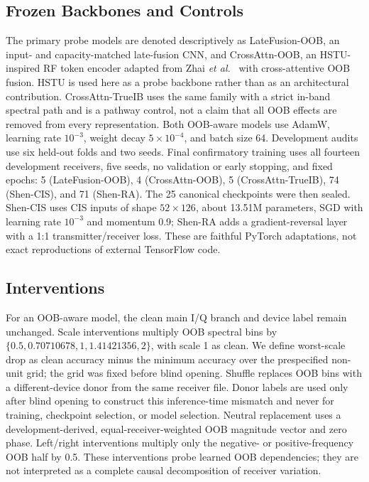 \subsection{Frozen Backbones and Controls}
The primary probe models are denoted descriptively as LateFusion-OOB, an input- and capacity-matched late-fusion CNN, and CrossAttn-OOB, an HSTU-inspired RF token encoder adapted from Zhai \emph{et al.}~\cite{zhai2024actions} with cross-attentive OOB fusion. HSTU is used here as a probe backbone rather than as an architectural contribution. CrossAttn-TrueIB uses the same family with a strict in-band spectral path and is a pathway control, not a claim that all OOB effects are removed from every representation. Both OOB-aware models use AdamW, learning rate $10^{-3}$, weight decay $5\times10^{-4}$, and batch size 64. Development audits use six held-out folds and two seeds. Final confirmatory training uses all fourteen development receivers, five seeds, no validation or early stopping, and fixed epochs: 5 (LateFusion-OOB), 4 (CrossAttn-OOB), 5 (CrossAttn-TrueIB), 74 (Shen-CIS), and 71 (Shen-RA). The 25 canonical checkpoints were then sealed. Shen-CIS uses CIS inputs of shape $52\times126$, about 13.51M parameters, SGD with learning rate $10^{-3}$ and momentum 0.9; Shen-RA adds a gradient-reversal layer with a 1:1 transmitter/receiver loss. These are faithful PyTorch adaptations, not exact reproductions of external TensorFlow code.

\subsection{Interventions}
For an OOB-aware model, the clean main I/Q branch and device label remain unchanged. Scale interventions multiply OOB spectral bins by $\{0.5,0.70710678,1,1.41421356,2\}$, with scale 1 as clean. We define worst-scale drop as clean accuracy minus the minimum accuracy over the prespecified non-unit grid; the grid was fixed before blind opening. Shuffle replaces OOB bins with a different-device donor from the same receiver file. Donor labels are used only after blind opening to construct this inference-time mismatch and never for training, checkpoint selection, or model selection. Neutral replacement uses a development-derived, equal-receiver-weighted OOB magnitude vector and zero phase. Left/right interventions multiply only the negative- or positive-frequency OOB half by 0.5. These interventions probe learned OOB dependencies; they are not interpreted as a complete causal decomposition of receiver variation.

